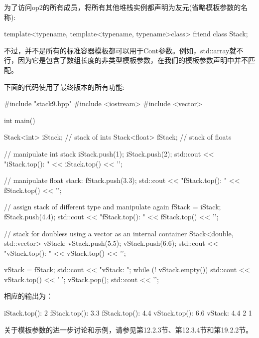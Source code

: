 为了访问op2的所有成员，将所有其他堆栈实例都声明为友元(省略模板参数的名称):

\begin{cpp}
template<typename, template<typename, typename>class>
friend class Stack;
\end{cpp}

不过，并不是所有的标准容器模板都可以用于Cont参数。例如，std::array就不行，因为它是包含了数组长度的非类型模板参数，在我们的模板参数声明中并不匹配。

下面的代码使用了最终版本的所有功能:

\begin{cpp}
#include "stack9.hpp"
#include <iostream>
#include <vector>

int main()
{
	Stack<int> iStack; // stack of ints
	Stack<float> fStack; // stack of floats
	
	// manipulate int stack
	iStack.push(1);
	iStack.push(2);
	std::cout << "iStack.top(): " << iStack.top() << '\n';
	
	// manipulate float stack:
	fStack.push(3.3);
	std::cout << "fStack.top(): " << fStack.top() << '\n';
	
	// assign stack of different type and manipulate again
	fStack = iStack;
	fStack.push(4.4);
	std::cout << "fStack.top(): " << fStack.top() << '\n';
	
	// stack for doubless using a vector as an internal container
	Stack<double, std::vector> vStack;
	vStack.push(5.5);
	vStack.push(6.6);
	std::cout << "vStack.top(): " << vStack.top() << '\n';
	
	vStack = fStack;
	std::cout << "vStack: ";
	while (! vStack.empty()) {
		std::cout << vStack.top() << ' ';
		vStack.pop();
	}
	std::cout << '\n';
}
\end{cpp}

相应的输出为：

\begin{shell}
iStack.top(): 2
fStack.top(): 3.3
fStack.top(): 4.4
vStack.top(): 6.6
vStack: 4.4 2 1
\end{shell}

关于模板参数的进一步讨论和示例，请参见第12.2.3节、第12.3.4节和第19.2.2节。





















